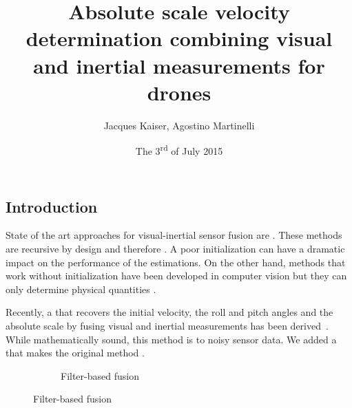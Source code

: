 \documentclass[final]{beamer}
\title
[ARSO, 1 - 3 July 2015, Lyon, France] %
{ %
Absolute scale velocity determination combining visual and inertial measurements for drones
}
\author{ %
Jacques Kaiser, Agostino Martinelli
}
\institute
[INRIA] %
{
  Team Chroma, INRIA
}
\date{The 3\textsuperscript{rd} of July 2015}
\begin{document}
\begin{frame}[t]
\begin{multicols}{3}

\section{Introduction}

State of the art approaches for visual-inertial sensor fusion are .
These methods are recursive by design and therefore .
A poor initialization can have a
dramatic impact on the performance of the estimations.
On the other hand, methods that work without initialization have been developed in computer vision but
they can only determine physical quantities .

Recently, a  that recovers the initial velocity, the roll and pitch angles and the absolute scale by fusing visual and inertial measurements has been derived~\cite{Martinelli2014,Martinelli2012}.
While mathematically sound, this method is  to noisy sensor data.
We added a  that makes the original method .



\begin{figure}
  \centering
  \hspace*{-1em}
  \begin{subfigure}[t]{0.3\columnwidth}
    \caption{Filter-based fusion}
    \hspace*{-3em}
\end{subfigure}
\end{figure}
\end{multicols}
\end{frame}
\end{document}
